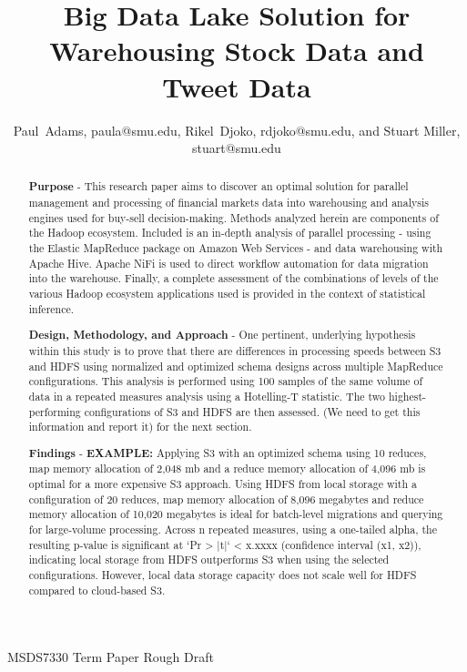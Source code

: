 \documentclass[journal]{IEEEtran}
\begin{document}
\title{Big Data Lake Solution for\\ 
	Warehousing Stock Data and Tweet Data}

\author{Paul~Adams, paula@smu.edu,
        Rikel~Djoko, rdjoko@smu.edu,
        and Stuart Miller, stuart@smu.edu}%

{MSDS7330 Term Paper Rough Draft}

\maketitle

\begin{abstract}
\textbf{Purpose} - This research paper aims to discover an optimal solution for parallel management and processing of financial markets data into  warehousing and analysis engines used for buy-sell decision-making. Methods analyzed herein are components of the Hadoop ecosystem. Included is an in-depth analysis of parallel processing - using the Elastic MapReduce package on Amazon Web Services - and data warehousing with Apache Hive. Apache NiFi is used to direct workflow automation for data migration into the warehouse. Finally, a complete assessment of the combinations of levels of the various Hadoop ecosystem applications used is provided in the context of statistical inference.

\textbf{Design, Methodology, and Approach} - One pertinent, underlying hypothesis within this study is to prove that there are differences in processing speeds between S3 and HDFS using normalized and optimized schema designs across multiple MapReduce configurations. This analysis is performed using 100 samples of the same volume of data in a repeated measures analysis using a Hotelling-T statistic. The two highest-performing configurations of S3 and HDFS are then assessed. (We need to get this information and report it) for the next section.

\textbf{Findings} - \textbf{EXAMPLE:} Applying S3 with an optimized schema using 10 reduces, map memory allocation of 2,048 mb and a reduce memory allocation of 4,096 mb is optimal for a more expensive S3 approach. Using HDFS from local storage with a configuration of 20 reduces, map memory allocation of 8,096 megabytes and reduce memory allocation of 10,020 megabytes is ideal for batch-level migrations and querying for large-volume processing. Across n repeated measures, using a one-tailed alpha, the resulting p-value is significant at `Pr > |t|` < x.xxxx (confidence interval (x1, x2)), indicating local storage from HDFS outperforms S3 when using the selected configurations. However, local data storage capacity does not scale well for HDFS compared to cloud-based S3.
\end{abstract}
\end{document}
